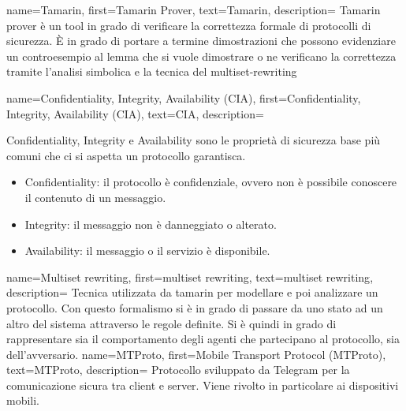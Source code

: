 {
    name={Tamarin},
    first={Tamarin Prover},
    text={Tamarin},
    description={
            Tamarin prover è un tool in grado di verificare la correttezza formale di protocolli di sicurezza.
            È in grado di portare a termine dimostrazioni che possono evidenziare un controesempio al lemma
            che si vuole dimostrare o ne verificano la correttezza tramite l'analisi simbolica e la tecnica del \gls{multiset-rewriting}
        }
}
{
    name={Confidentiality, Integrity, Availability (CIA)},
    first={Confidentiality, Integrity, Availability (CIA)},
    text={CIA},
    description={
            Confidentiality, Integrity e Availability sono le proprietà di sicurezza base più comuni che ci si aspetta un protocollo garantisca.
            \begin{itemize}
                \item Confidentiality: il protocollo è confidenziale, ovvero non è possibile conoscere il contenuto di un messaggio.
                \item Integrity: il messaggio non è danneggiato o alterato.
                \item Availability: il messaggio o il servizio è disponibile.
            \end{itemize}
        }
}
{
    name={Multiset rewriting},
    first={multiset rewriting},
    text={multiset rewriting},
    description={
            Tecnica utilizzata da \gls{tamarin} per modellare e poi analizzare un protocollo.
            Con questo formalismo si è in grado di passare da uno stato ad un altro del sistema attraverso le regole definite.
            Si è quindi in grado di rappresentare sia il comportamento degli agenti che partecipano al protocollo, sia dell'avversario.
        }
}
{
    name={MTProto},
    first={Mobile Transport Protocol (MTProto)},
    text={MTProto},
    description={
            Protocollo sviluppato da Telegram per la comunicazione sicura tra client e server.
            Viene rivolto in particolare ai dispositivi mobili.
        }
}
